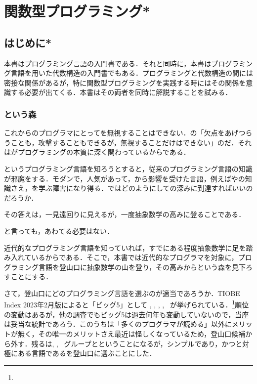 \documentclass[a5paper,twoside,fleqn,draft]{jsbook}
\begin{document}
\part{関数型プログラミング*}

\chapter{はじめに*}
\label{ch:introduction}

\begin{leader}
本書はプログラミング言語\haskell の入門書である．それと同時に，本書はプログラミング言語を用いた代数構造の入門書でもある．プログラミングと代数構造の間には密接な関係があるが，特に関数型プログラミングを実践する時にはその関係を意識する必要が出てくる．本書はその両者を同時に解説することを試みる．
\end{leader}

\section{\haskell という森}

これからのプログラマにとって\haskell を無視することはできない．\haskell の「欠点をあげつらうことも，攻撃することもできるが，無視することだけはできない」のだ．それは\haskell がプログラミングの本質に深く関わっているからである．

\haskell というプログラミング言語を知ろうとすると，従来のプログラミング言語の知識が邪魔をする．モダンで，人気があって，\haskell から影響を受けた言語，例えば\ruby や\swift の知識さえ，\haskell を学ぶ障害になり得る．ではどのようにして\haskell の深みに到達すればいいのだろうか．

その答えは，一見遠回りに見えるが，一度抽象数学の高みに登ることである．

と言っても，あわてる必要はない．

近代的なプログラミング言語を知っていれば，すでにある程度抽象数学に足を踏み入れているからである．そこで，本書では近代的なプログラマを対象に，プログラミング言語を登山口に抽象数学の山を登り，その高みから\haskell という森を見下ろすことにする．


さて，登山口にどのプログラミング言語を選ぶのが適当であろうか．TIOBE Index 2023年2月版によると「ビッグ5」として \python, \clang, \cxx, \java, \csharp\ が挙げられている．\footnote{}順位の変動はあるが，他の調査でもビッグ5は過去何年も変動していないので，当座は妥当な統計であろう．このうち\clang は「多くのプログラマが読める」以外にメリットが無く，その唯一のメリットさえ最近は怪しくなっているため，登山口候補から外す．残るは\java, \cxx, \csharp\ グループと\python ということになるが，シンプルであり，かつ\haskell と対極にある言語である\python を登山口に選ぶことにした．
\end{document}
